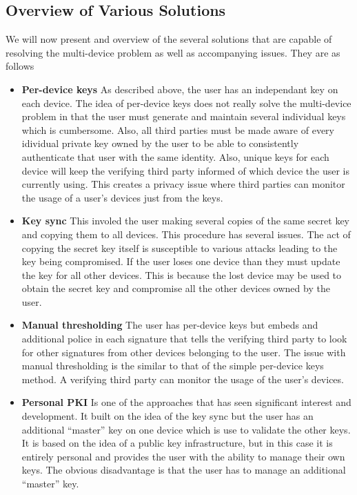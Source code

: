 \subsection{Overview of Various Solutions}
We will now present and overview of the several solutions that are capable of resolving the multi-device problem as well as accompanying issues. They are as follows\cite{Atwater2016}

\begin{itemize}

\item \textbf{Per-device keys} As described above, the user has an independant key on each device. The idea of per-device keys does not really solve the multi-device problem in that the user must generate and maintain several individual keys which is cumbersome. Also, all third parties must be made aware of every idividual private key owned by the user to be able to consistently authenticate that user with the same identity. Also, unique keys for each device will keep the verifying third party informed of which device the user is currently using. This creates a privacy issue where third parties can monitor the usage of a user's devices just from the keys.\\

\item \textbf{Key sync} This involed the user making several copies of the same secret key and copying them to all devices. This procedure has several issues. The act of copying the secret key itself is susceptible to various attacks leading to the key being compromised. If the user loses one device than they must update the key for all other devices. This is because the lost device may be used to obtain the secret key and compromise all the other devices owned by the user.\\

\item \textbf{Manual thresholding} The user has per-device keys but embeds and additional police in each signature that tells the verifying third party to look for other signatures from other devices belonging to the user. The issue with manual thresholding is the similar to that of the simple per-device keys method. A verifying third party can monitor the usage of the user's devices.\\

\item \textbf{Personal PKI} Is one of the approaches that has seen significant interest and development. It built on the idea of the key sync but the user has an additional ``master'' key on one device which is use to validate the other keys. It is based on the idea of a public key infrastructure, but in this case it is entirely personal and provides the user with the ability to manage their own keys.  The obvious disadvantage is that the user has to manage an additional ``master'' key.\\


\end{itemize}
